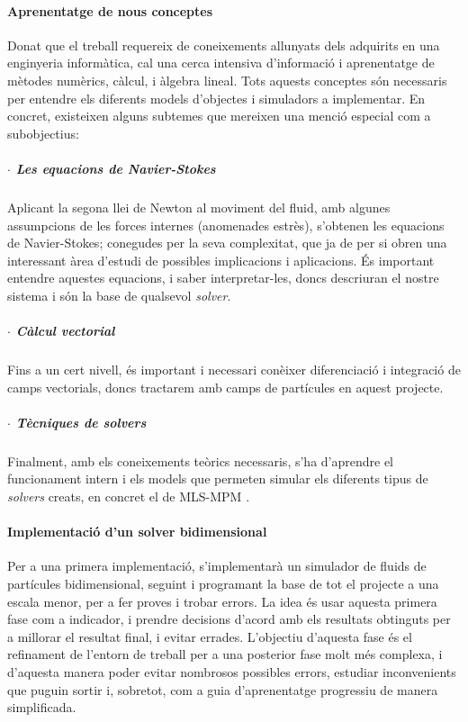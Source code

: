 \documentclass[a4paper]{report}
\begin{document}
	\paragraph{Aprenentatge de nous conceptes} Donat que el treball requereix de coneixements allunyats dels adquirits en una enginyeria informàtica, cal una cerca intensiva d'informació i aprenentatge de mètodes numèrics, càlcul, i àlgebra lineal. Tots aquests conceptes són necessaris per entendre els diferents models d'objectes i simuladors a implementar. \newline
	En concret, existeixen alguns subtemes que mereixen una menció especial com a subobjectius:
	\subparagraph[Navier-Stokes]{$\cdot$ Les equacions de Navier-Stokes} Aplicant la segona llei de Newton al moviment del fluid, amb algunes assumpcions de les forces internes (anomenades estrès), s'obtenen les equacions de Navier-Stokes; conegudes per la seva complexitat, que ja de per si obren una interessant àrea d'estudi de possibles implicacions i aplicacions.
	\newline
	És important entendre aquestes equacions, i saber interpretar-les, doncs descriuran el nostre sistema i són la base de qualsevol \textit{solver}.
	\subparagraph[Càlcul vectorial]{$\cdot$ Càlcul vectorial} Fins a un cert nivell, és important i necessari conèixer diferenciació i integració de camps vectorials, doncs tractarem amb camps de partícules en aquest projecte.
	\subparagraph[Tècniques de solvers]{$\cdot$ Tècniques de solvers} Finalment, amb els coneixements teòrics necessaris, s'ha d'aprendre el funcionament intern i els models que permeten simular els diferents tipus de \textit{solvers} creats, en concret el de MLS-MPM \cite{hu2018mlsmpmcpic}.
	
	\paragraph{Implementació d'un solver bidimensional} Per a una primera implementació, s'implementarà un simulador de fluids de partícules bidimensional, seguint\cite{Hu,hu2018mlsmpmcpic} i programant la base de tot el projecte a una escala menor, per a fer proves i trobar errors. La idea és usar aquesta primera fase com a indicador, i prendre decisions d'acord amb els resultats obtinguts per a millorar el resultat final, i evitar errades. \newline
	L'objectiu d'aquesta fase és el refinament de l'entorn de treball per a una posterior fase molt més complexa, i d'aquesta manera poder evitar nombrosos possibles errors, estudiar inconvenients que puguin sortir i, sobretot, com a guia d'aprenentatge progressiu de manera simplificada. 
	
\end{document}
